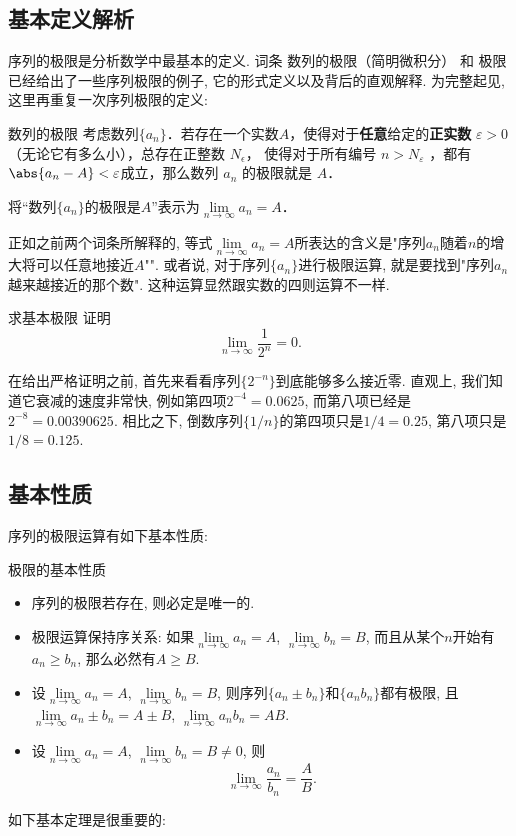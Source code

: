 

\subsection{基本定义解析}

序列的极限是分析数学中最基本的定义. 词条 数列的极限（简明微积分） 和 极限 已经给出了一些序列极限的例子, 它的形式定义以及背后的直观解释. 为完整起见, 这里再重复一次序列极限的定义:

\begin{definition}{数列的极限}
考虑数列$\{a_n\}$．若存在一个实数$A$，使得对于\textbf{任意}给定的\textbf{正实数} $\varepsilon > 0$（无论它有多么小），总存在正整数 $N_\epsilon$， 使得对于所有编号 $n>N_\varepsilon$ ，都有 $\abs{a_n - A} < \varepsilon$成立，那么数列 $a_n$ 的极限就是 $A$．

将“数列$\{a_n\}$的极限是$A$”表示为$\lim\limits_{n\to\infty}a_n=A$．
\end{definition}

正如之前两个词条所解释的, 等式$\lim\limits_{n\to\infty}a_n=A$所表达的含义是"序列$a_n$随着$n$的增大将可以任意地接近$A$"". 或者说, 对于序列$\{a_n\}$进行极限运算, 就是要找到"序列$a_n$越来越接近的那个数". 这种运算显然跟实数的四则运算不一样.

\begin{example}{求基本极限}
证明$$\lim\limits_{n\to\infty}\frac{1}{2^n}=0.$$

在给出严格证明之前, 首先来看看序列$\{2^{-n}\}$到底能够多么接近零. 直观上, 我们知道它衰减的速度非常快, 例如第四项$2^{-4}=0.0625$, 而第八项已经是$2^{-8}=0.00390625$. 相比之下, 倒数序列$\{1/n\}$的第四项只是$1/4=0.25$, 第八项只是$1/8=0.125$. 
\end{example}

\subsection{基本性质}
序列的极限运算有如下基本性质:

\begin{theorem}{极限的基本性质}
\begin{itemize}
\item 序列的极限若存在, 则必定是唯一的.
\item 极限运算保持序关系: 如果$\lim\limits_{n\to\infty}a_n=A$, $\lim\limits_{n\to\infty}b_n=B$, 而且从某个$n$开始有$a_n\geq b_n$, 那么必然有$A\geq B$.
\item 设$\lim\limits_{n\to\infty}a_n=A$, $\lim\limits_{n\to\infty}b_n=B$, 则序列$\{a_n\pm b_n\}$和$\{a_n b_n\}$都有极限, 且$\lim\limits_{n\to\infty}a_n\pm b_n=A\pm B$, $\lim\limits_{n\to\infty}a_nb_n=AB$.
\item 设$\lim\limits_{n\to\infty}a_n=A$, $\lim\limits_{n\to\infty}b_n=B\neq0$, 则
$$
\lim\limits_{n\to\infty}\frac{a_n}{b_n}=\frac{A}{B}.
$$
\end{itemize}
\end{theorem}

如下基本定理是很重要的:
